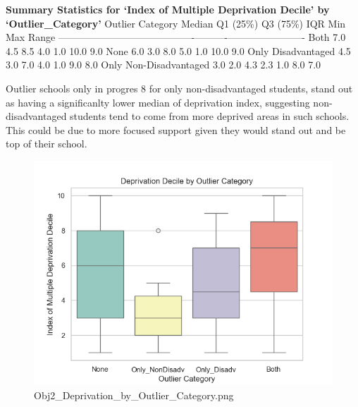 \documentclass[
  letterpaper,
  DIV=11,
  numbers=noendperiod]{scrartcl}
\begin{document}
\textbf{Summary Statistics for `Index of Multiple Deprivation Decile' by
`Outlier\_Category'} \textbar{} Outlier Category \textbar{} Median
\textbar{} Q1 (25\%) \textbar{} Q3 (75\%) \textbar{} IQR \textbar{} Min
\textbar{} Max \textbar{} Range \textbar{}
\textbar------------------------\textbar--------\textbar----------\textbar----------\textbar------\textbar-----\textbar------\textbar-------\textbar{}
\textbar{} Both \textbar{} 7.0 \textbar{} 4.5 \textbar{} 8.5 \textbar{}
4.0 \textbar{} 1.0 \textbar{} 10.0 \textbar{} 9.0 \textbar{} \textbar{}
None \textbar{} 6.0 \textbar{} 3.0 \textbar{} 8.0 \textbar{} 5.0
\textbar{} 1.0 \textbar{} 10.0 \textbar{} 9.0 \textbar{} \textbar{} Only
Disadvantaged \textbar{} 4.5 \textbar{} 3.0 \textbar{} 7.0 \textbar{}
4.0 \textbar{} 1.0 \textbar{} 9.0 \textbar{} 8.0 \textbar{} \textbar{}
Only Non-Disadvantaged \textbar{} 3.0 \textbar{} 2.0 \textbar{} 4.3
\textbar{} 2.3 \textbar{} 1.0 \textbar{} 8.0 \textbar{} 7.0 \textbar{}

Outlier schools only in progres 8 for only non-disadvantaged students,
stand out as having a significanlty lower median of deprivation index,
suggesting non-disadvantaged students tend to come from more deprived
areas in such schools. This could be due to more focused support given
they would stand out and be top of their school.

\begin{figure}[H]

{\centering \includegraphics{images/Obj2_Deprivation_by_Outlier_Category.png}

}

\caption{Obj2\_Deprivation\_by\_Outlier\_Category.png}

\end{figure}%
\end{document}
